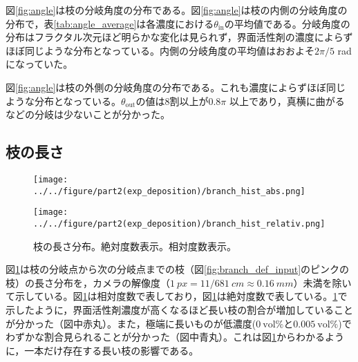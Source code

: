 \documentclass[autodetect-engine,dvi=dvipdfmx,a4paper,ja=standard,oneside,openany,11pt]{bxjsbook}
\begin{document}
図\ref{fig:angle}は枝の分岐角度の分布である。図\ref{fig:angle}は枝の内側の分岐角度の分布で，表\ref{tab:angle_average}は各濃度における$\theta_{\mathrm{in}}$の平均値である。分岐角度の分布はフラクタル次元ほど明らかな変化は見られず，界面活性剤の濃度によらずほぼ同じような分布となっている。内側の分岐角度の平均値はおおよそ$2\pi/5$ radになっていた。

図\ref{fig:angle}は枝の外側の分岐角度の分布である。これも濃度によらずほぼ同じような分布となっている。$\theta_{\mathrm{out}}$の値は8割以上が$0.8\pi$ 以上であり，真横に曲がるなどの分岐は少ないことが分かった。
\subsection{枝の長さ}

\begin{figure}[htbp]
  \begin{minipage}
    {0.45\textwidth}
    \subcaption{}
    \centering
    \texttt{[image: ../../figure/part2(exp\_deposition)/branch\_hist\_abs.png]}
    \label{fig:branch_length_absolute}
  \end{minipage}
  \begin{minipage}
    {0.45\textwidth}
    \subcaption{}
    \centering
    \texttt{[image: ../../figure/part2(exp\_deposition)/branch\_hist\_relativ.png]}
    \label{fig:branch_length_relativ}
  \end{minipage}
  \caption{枝の長さ分布。絶対度数表示。相対度数表示。}
  \label{fig:branch_length}
\end{figure}

図\ref{fig:branch_length}は枝の分岐点から次の分岐点までの枝（図\ref{fig:branch_def_input}のピンクの枝）の長さ分布を，カメラの解像度（$\SI{1}{px}=11/\SI{681}{cm}\approx \SI{0.16}{mm}$）未満を除いて示している。図\ref{fig:branch_length}は相対度数で表しており，図\ref{fig:branch_length}は絶対度数で表している。\ref{fig:branch_length}で示したように，界面活性剤濃度が高くなるほど長い枝の割合が増加していることが分かった（図中赤丸）。また，極端に長いものが低濃度($\SI{0}{\mathrm{vol}\%}$と$\SI{0.005}{\mathrm{vol}\%}$)でわずかな割合見られることが分かった（図中青丸）。これは図\ref{fig:branch_length}からわかるように，一本だけ存在する長い枝の影響である。
\end{document}
